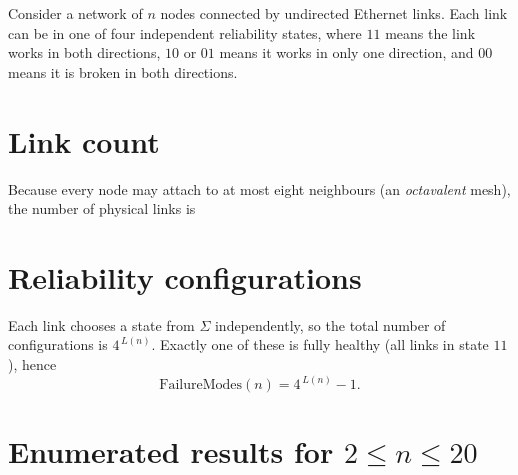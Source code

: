 \documentclass[../HFT-main.tex]{subfiles}
\begin{document}
Consider a network of \(n\) nodes connected by undirected Ethernet
links.  Each link can be in one of four independent reliability
states,
\marginnote{
\[
\Sigma=\{00,01,10,11\},
\]}
where \(11\) means the link works in both directions, \(10\) or
\(01\) means it works in only one direction, and \(00\) means it
is broken in both directions.

\section{Link count}

Because every node may attach to at most eight neighbours (an
\emph{octavalent} mesh), the number of physical links is
\marginnote{
\[
L(n)=\min\!\bigl\{\tbinom{n}{2},\,4n\bigr\}
=
\begin{cases}
\binom{n}{2}, & n\le 9,\\[6pt]
4n,            & n\ge 9.
\end{cases}
\]}

\section{Reliability configurations}

Each link chooses a state from \(\Sigma\) independently, so the total
number of configurations is \(4^{\,L(n)}\).
Exactly one of these is fully healthy (all links in state \(11\)), hence
\[
\text{FailureModes}(n)=4^{\,L(n)}-1.
\]

\section{Enumerated results for \(2\le n\le20\)}
\end{document}
